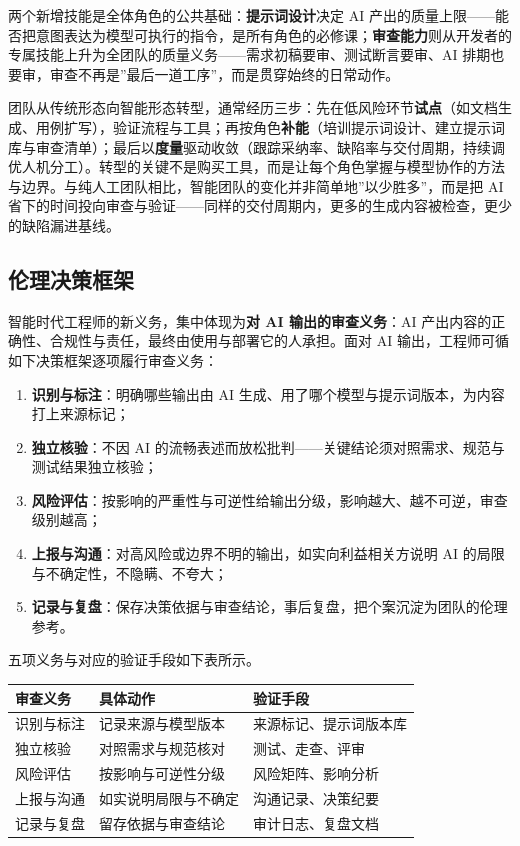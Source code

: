 \documentclass[
]{ctexbook}
\providecommand{\tightlist}{\setlength{\itemsep}{0pt}\setlength{\parskip}{0pt} }
\newcounter{none}
\begin{document}
两个新增技能是全体角色的公共基础：\textbf{提示词设计}决定 AI
产出的质量上限------能否把意图表达为模型可执行的指令，是所有角色的必修课；\textbf{审查能力}则从开发者的专属技能上升为全团队的质量义务------需求初稿要审、测试断言要审、AI
排期也要审，审查不再是''最后一道工序''，而是贯穿始终的日常动作。

团队从传统形态向智能形态转型，通常经历三步：先在低风险环节\textbf{试点}（如文档生成、用例扩写），验证流程与工具；再按角色\textbf{补能}（培训提示词设计、建立提示词库与审查清单）；最后以\textbf{度量}驱动收敛（跟踪采纳率、缺陷率与交付周期，持续调优人机分工）。转型的关键不是购买工具，而是让每个角色掌握与模型协作的方法与边界。与纯人工团队相比，智能团队的变化并非简单地''以少胜多''，而是把
AI
省下的时间投向审查与验证------同样的交付周期内，更多的生成内容被检查，更少的缺陷漏进基线。

\subsection{伦理决策框架}\label{ux4f26ux7406ux51b3ux7b56ux6846ux67b6}

智能时代工程师的新义务，集中体现为\textbf{对 AI 输出的审查义务}：AI
产出内容的正确性、合规性与责任，最终由使用与部署它的人承担。面对 AI
输出，工程师可循如下决策框架逐项履行审查义务：

\begin{enumerate}
\def\labelenumi{\arabic{enumi}.}
\tightlist
\item
  \textbf{识别与标注}：明确哪些输出由 AI
  生成、用了哪个模型与提示词版本，为内容打上来源标记；
\item
  \textbf{独立核验}：不因 AI
  的流畅表述而放松批判------关键结论须对照需求、规范与测试结果独立核验；
\item
  \textbf{风险评估}：按影响的严重性与可逆性给输出分级，影响越大、越不可逆，审查级别越高；
\item
  \textbf{上报与沟通}：对高风险或边界不明的输出，如实向利益相关方说明 AI
  的局限与不确定性，不隐瞒、不夸大；
\item
  \textbf{记录与复盘}：保存决策依据与审查结论，事后复盘，把个案沉淀为团队的伦理参考。
\end{enumerate}

五项义务与对应的验证手段如下表所示。

{\def\LTcaptype{none} %
\begin{longtable}[]{@{}lll@{}}
\toprule\noalign{}
审查义务 & 具体动作 & 验证手段 \\
\midrule\noalign{}
\endhead
\bottomrule\noalign{}
\endlastfoot
识别与标注 & 记录来源与模型版本 & 来源标记、提示词版本库 \\
独立核验 & 对照需求与规范核对 & 测试、走查、评审 \\
风险评估 & 按影响与可逆性分级 & 风险矩阵、影响分析 \\
上报与沟通 & 如实说明局限与不确定 & 沟通记录、决策纪要 \\
记录与复盘 & 留存依据与审查结论 & 审计日志、复盘文档 \\
\end{longtable}
}
\end{document}
